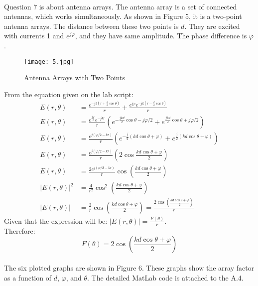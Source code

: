 \documentclass[12pt]{article}
\begin{document}
    \paragraph{}
    Question 7 is about antenna arrays. The antenna array is a set of connected antennas, which works simultaneously\cite{5}. As shown in Figure 5, it is a two-point antenna arrays. The distance between these two points is $d$. They are excited with currents 1 and $e^{j\varphi}$, and they have same amplitude. The phase difference is $\varphi$.
    \begin{figure}[H]
    \centering
    \texttt{[image: 5.jpg]}
    \caption{Antenna Arrays with Two Points\cite{6}}
    \end{figure}
    From the equation given on the lab script:
    \begin{align*}
        E(r, \theta) &= \frac{e^{-jk(r + \frac{d}{2} \cos \theta)}}{r} + \frac{e^{j\varphi}e^{-jk(r - \frac{d}{2} \cos \theta)}}{r} \\
                    E(r, \theta)&= \frac{e^{\frac{j\varphi}{2}} e^{-jkr}}{r}  \left( e^{-\frac{jkd}{2} \cos \theta - j\varphi/2} + e^{\frac{jkd}{2} \cos \theta + j\varphi/2} \right ) \\
                    E(r, \theta)&= \frac{e^{j(\varphi/2 - kr)}}{r}  \left( e^{-\frac{j}{2} (kd\cos\theta + \varphi)} + e^{\frac{j}{2} (kd\cos\theta + \varphi)} \right ) \\
                    E(r, \theta)&= \frac{e^{j(\varphi/2 - kr)}}{r}  \left( 2 \cos\frac{kd\cos \theta + \varphi}{2} \right) \\
                    E(r, \theta)&= \frac{2e^{j(\varphi/2 - kr)}}{r} \cos(\frac{kd\cos \theta + \varphi}{2})\\
                    |E(r, \theta)|^2&=\frac{4}{r^2}\cos^2 \left (\frac{kd\cos \theta + \varphi}{2} \right )\\
                    |E(r, \theta)|&=\frac{2}{r}\cos \left (\frac{kd\cos \theta + \varphi}{2} \right )=\frac{2\cos \left (\frac{kd\cos \theta + \varphi}{2} \right )}{r}
    \end{align*}
    Given that the expression will be: $|E(r, \theta)| = \frac{F(\theta)}{r}$.\\
    Therefore:
    \begin{equation}
        F(\theta)=2\cos \left (\frac{kd\cos \theta + \varphi}{2} \right )
    \end{equation}
    \paragraph{}
    The six plotted graphs are shown in Figure 6. These graphs show the array factor as a function of $d$, $\varphi$, and $\theta$. The detailed MatLab code is attached to the A.4.
    
\end{document}
